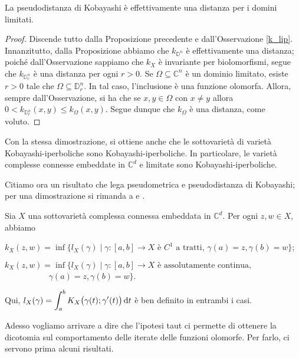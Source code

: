 \begin{cor}
    La pseudodistanza di Kobayashi è effettivamente una distanza per i domini limitati.
\end{cor}
\begin{proof}
    Discende tutto dalla Proposizione precedente e dall'Osservazione \ref{k_lip}. Innanzitutto, dalla Proposizione abbiamo che $k_{\mathbb{D}^n}$ è effettivamente una distanza; poiché dall'Osservazione sappiamo che $k_X$ è invariante per biolomorfismi, segue che $k_{\mathbb{D}_r^n}$ è una distanza per ogni $r>0$. Se $\Omega\subseteq\mathbb{C}^n$ è un dominio limitato, esiste $r>0$ tale che $\Omega\subseteq\mathbb{D}_r^n$. In tal caso, l'inclusione è una funzione olomorfa. Allora, sempre dall'Osservazione, si ha che se $x,y \in \Omega$ con $x\not=y$ allora $0<k_{\mathbb{D}_r^n}(x,y) \le k_{\Omega}(x,y)$. Segue dunque che $k_\Omega$ è una distanza, come voluto.
\end{proof}

\begin{oss}
    Con la stessa dimostrazione, si ottiene anche che le sottovarietà di varietà Kobayashi-iperboliche sono Kobayashi-iperboliche. In particolare, le varietà complesse connesse embeddate in $\mathbb{C}^d$ e limitate sono Kobayashi-iperboliche.
\end{oss}

Citiamo ora un risultato che lega pseudometrica e pseudodistanza di Kobayashi; per una dimostrazione si rimanda a \cite[Theorem 1]{R} e \cite[Theorem 3.1]{V}.

\begin{thm} \label{lung_int}
    \cite[Result 2.1]{CMS} Sia $X$ una sottovarietà complessa connessa embeddata in $\mathbb{C}^d$. Per ogni $z,w \in X$, abbiamo
    \begin{nlist}
        \item $k_X(z,w)=\inf\{l_X(\gamma) \mid \gamma:[a,b] \longrightarrow X\text{ è $C^1$ a tratti, }\gamma(a)=z,\gamma(b)=w\}$;
        \item $k_X(z,w)=\inf\{l_X(\gamma) \mid \gamma:[a,b] \longrightarrow X\text{ è assolutamente continua,}$\\
        $\text{    }\qquad\qquad\,\,\,\,\gamma(a)=z,\gamma(b)=w\}$.
    \end{nlist}
    Qui, $l_X(\gamma)=\displaystyle\int_a^b K_X\big(\gamma(t);\gamma'(t)\big)\mathop{}\!\mathrm{d} t$ è ben definito in entrambi i casi.
\end{thm}

Adesso vogliamo arrivare a dire che l'ipotesi taut ci permette di ottenere la dicotomia sul comportamento delle iterate delle funzioni olomorfe. Per farlo, ci servono prima alcuni risultati.


